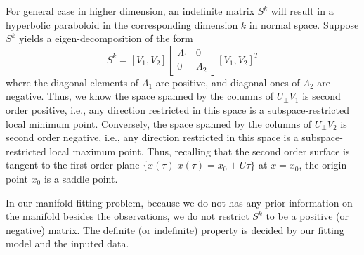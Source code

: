 \documentclass[aos,preprint]{imsart}
\theoremstyle{remark}
\begin{document}
 For general case in higher dimension,  an indefinite matrix $S^k$ will result in a  hyperbolic paraboloid in the corresponding dimension $k$ in normal space. Suppose $S^k$ yields a eigen-decomposition of the form
 \[
 S^k = [V_1,V_2]
 \left[
 \begin{array}{cc}
 \Lambda_1&0\\
 0&\Lambda_2
 \end{array}
 \right]
 [V_1,V_2]^T
 \]
 where the diagonal elements  of $\Lambda_1$ are positive, and diagonal ones of $\Lambda_2$ are negative. Thus, we know the space spanned by the columns of $U_\perp V_1$ is second order positive, i.e., any direction restricted in this space is a subspace-restricted local minimum point. Conversely,  the space spanned by the columns of $U_\perp V_2$ is second order negative, i.e., any direction restricted in this space is a subspace-restricted local maximum point. Thus, recalling that the second order surface is tangent to the first-order plane $\{x(\tau) |x(\tau)=x_0+U\tau\}$ at $x=x_0$, the origin point $x_0$ is a saddle point.
 
 In our manifold fitting problem, because we do not has any prior information on the manifold besides the observations, we do not restrict $S^k$ to be a positive (or negative) matrix. The definite (or indefinite) property is decided by our fitting model and the inputed data.

%
\end{document}
